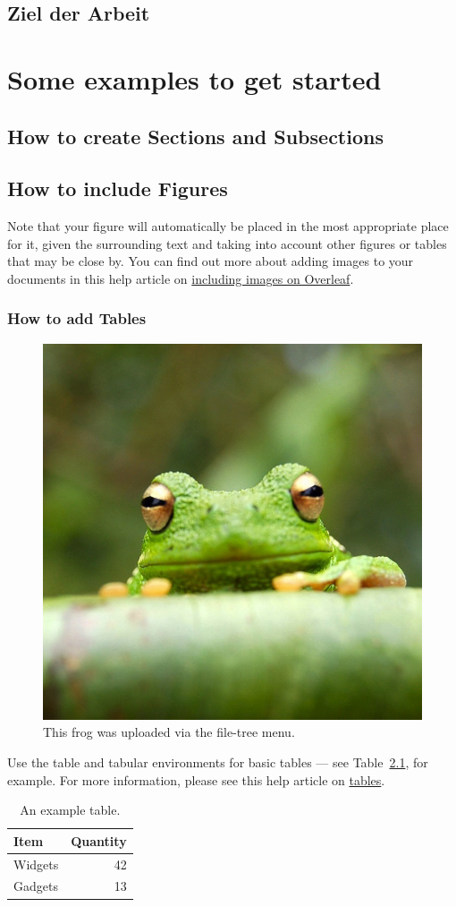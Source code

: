 \documentclass[a4paper,12pt]{scrreprt}
\begin{document}
\section{Ziel der Arbeit}


\chapter{Some examples to get started}
\section{How to create Sections and Subsections}

\section{How to include Figures}
Note that your figure will automatically be placed in the most appropriate place for it, given the surrounding text and taking into account other figures or tables that may be close by. You can find out more about adding images to your documents in this help article on \href{https://www.overleaf.com/learn/how-to/Including_images_on_Overleaf}{including images on Overleaf}.
\subsection{How to add Tables}

\begin{figure}
\centering
\includegraphics[width=0.25\linewidth]{frog.jpg}
\caption{\label{fig:frog}This frog was uploaded via the file-tree menu.}
\end{figure}


Use the table and tabular environments for basic tables --- see Table~\ref{tab:widgets}, for example. For more information, please see this help article on \href{https://www.overleaf.com/learn/latex/tables}{tables}. 

\begin{table}
\centering
\begin{tabular}{l|r}
Item & Quantity \\\hline
Widgets & 42 \\
Gadgets & 13
\end{tabular}
\caption{\label{tab:widgets}An example table.}
\end{table}
\end{document}
